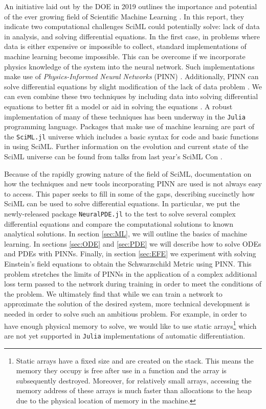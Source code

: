 \documentclass{CUP-JNL-DTM}%
\theoremstyle{definition}
\numberwithin{equation}{section}
\newcommand{\Julia}{\texttt{Julia} }
\begin{document}
An initiative laid out by the DOE in 2019 outlines the importance and potential of the ever growing field of Scientific Machine Learning \cite{bakerWorkshopReportBasic2019}. In this report, they indicate two computational challenges SciML could potentially solve: lack of data in analysis, and solving differential equations. In the first case, in problems where data is either expensive or impossible to collect, standard implementations of machine learning become impossible. This can be overcome if we incorporate physics knowledge of the system into the neural network. Such implementations make use of \emph{Physics-Informed Neural Networks} (PINN) \cite{karniadakisPhysicsinformedMachineLearning2021}. Additionally, PINN can solve differential equations by slight modification of the lack of data problem \cite{lagarisArtificialNeuralNetworks1997,hanSolvingHighdimensionalPartial2018,blechschmidtThreeWaysSolve2021}. We can even combine these two techniques by including data into solving differential equations to better fit a model or aid in solving the equations \cite{raissiPhysicsinformedNeuralNetworks2019}. A robust implementation of many of these techniques has been underway in the \Julia programming language. Packages that make use of machine learning are part of the \texttt{SciML.jl} universe which includes a basic syntax for code and basic functions in using SciML. Further information on the evolution and current state of the SciML universe can be found from talks from last year's SciML Con \cite{SciMLCon2022}. 

Because of the rapidly growing nature of the field of SciML, documentation on how the techniques and new tools incorporating PINN are used is not always easy to access. This paper seeks to fill in some of the gaps, describing succinctly how SciML can be used to solve differential equations. In particular, we put the newly-released package \texttt{NeuralPDE.jl} to the test to solve several complex differential equations and compare the computational solutions to known analytical solutions. In section \ref{sec:ML}, we will outline the basics of machine learning. In sections \ref{sec:ODE} and \ref{sec:PDE} we will describe how to solve ODEs and PDEs with PINNs. Finally, in section \ref{sec:EFE} we experiment with solving Einstein's field equations to obtain the Schwarzschild Metric using PINN. This problem stretches the limits of PINNs in the application of a complex additional loss term passed to the network during training in order to meet the conditions of the problem. We ultimately find that while we can train a network to approximate the solution of the desired system, more technical development is needed in order to solve such an ambitious problem. For example, in order to have enough physical memory to solve, we would like to use static arrays\footnote{Static arrays have a fixed size and are created on the stack. This means the memory they occupy is free after use in a function and the array is subsequently destroyed. Moreover, for relatively small arrays, accessing the memory address of these arrays is much faster than allocations to the heap due to the physical location of memory in the machine.} which are not yet supported in \Julia implementations of automatic differentiation.   
\end{document}
